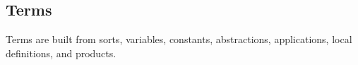 







\subsection{Terms}
\label{cic:terms}

Terms are built from sorts, variables, constants,
abstractions, applications, local definitions,
and products.

